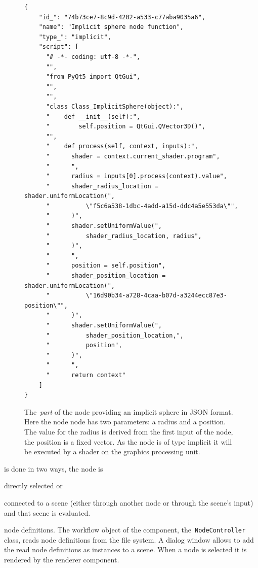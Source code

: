 \documentclass[%
    a4paper,    %
    justified,  %
    nobib,      %
    openany     %
]{tufte-book}
\makeatletter
\renewcommand{\label}[1]{\@tufte@label{##1}}%
\makeatother
\begin{document}
\begin{figure}[!htbp]
  \begin{verbatim}
{
    "id_": "74b73ce7-8c9d-4202-a533-c77aba9035a6",
    "name": "Implicit sphere node function",
    "type_": "implicit",
    "script": [
      "# -*- coding: utf-8 -*-",
      "",
      "from PyQt5 import QtGui",
      "",
      "",
      "class Class_ImplicitSphere(object):",
      "    def __init__(self):",
      "        self.position = QtGui.QVector3D()",
      "",
      "    def process(self, context, inputs):",
      "      shader = context.current_shader.program",
      "      ",
      "      radius = inputs[0].process(context).value",
      "      shader_radius_location = shader.uniformLocation(",
      "          \"f5c6a538-1dbc-4add-a15d-ddc4a5e553da\"",
      "      )",
      "      shader.setUniformValue(",
      "          shader_radius_location, radius",
      "      )",
      "      ",
      "      position = self.position",
      "      shader_position_location = shader.uniformLocation(",
      "          \"16d90b34-a728-4caa-b07d-a3244ecc87e3-position\"",
      "      )",
      "      shader.setUniformValue(",
      "          shader_position_location,",
      "          position",
      "      )",
      "      ",
      "      return context"
    ]
}
  \end{verbatim}
\caption{The~\emph{part} of the node providing an implicit sphere in JSON
  format. Here the node node has two parameters: a radius and a position. The
  value for the radius is derived from the first input of the node, the position
  is a fixed vector. As the node is of type implicit it will be executed by a
  shader on the graphics processing unit.}
\label{fig:node-part-example}
\end{figure}

\newpage{}

 is done in two ways, the node is
\begin{enumerate*}
  \item directly selected or
  \item connected to a scene (either through another node or
    through the scene's input) and that scene is evaluated.
\end{enumerate*}

 node definitions. The workflow object of the
component, the~\verb=NodeController= class, reads node definitions from the file
system. A dialog window allows to add the read node definitions as instances to
a scene. When a node is selected it is rendered by the renderer component.
\end{document}
